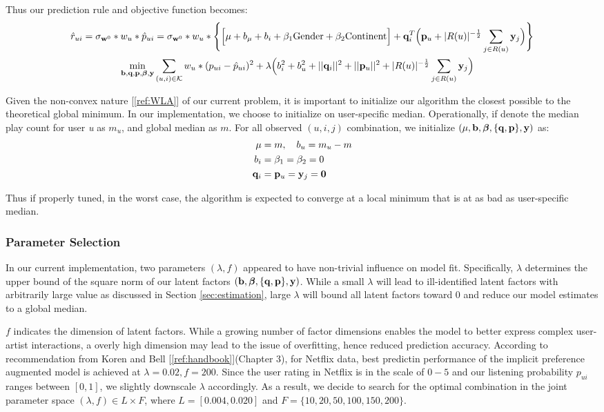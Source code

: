 \documentclass[11pt]{article}
\theoremstyle{definition}
\begin{document}
Thus our prediction rule and objective function becomes:
\begin{align*}
\hat{r}_{ui} = \sigma_{{\bf w}^0}*w_u*\hat{p}_{ui} &= 
\sigma_{{\bf w}^0}*w_u*
\Bigg\{ 
\Big[ \mu + b_\mu + b_i + \beta_1\mbox{Gender} + \beta_2\mbox{Continent} \Big] + 
{\bf q}_i^T \Big({\bf p}_u+|R(u)|^{-\frac{1}{2}} \sum_{j \in R(u)}{\bf y}_j \Big)
\Bigg\}
\\
\min_{{\bf b}, {\bf q},{\bf p}, \boldsymbol{\beta}, {\bf y}} & \sum_{(u, i) \in {\cal K}} w_u * (p_{ui} - \hat{p}_{ui})^2 + \lambda \Big(b_i^2 + b_u^2 + ||{\bf q}_i||^2 + ||{\bf p}_u||^2 +|R(u)|^{-\frac{1}{2}} \sum_{j \in R(u)}{\bf y}_j \Big)
\end{align*}

Given the non-convex nature [\ref{ref:WLA}] of our current problem, it is important to initialize our algorithm the closest possible to the theoretical  global minimum. In our implementation, we choose to initialize on user-specific median. Operationally, if denote the median play count for user \textit{u} as $m_u$, and global median as $m$. For all observed $(u, i, j)$ combination, we initialize $(\mu, {\bf b}, \boldsymbol{\beta}, \{{\bf q}, {\bf p}\}, {\bf y})$ as:
\begin{align*}
\mu &= m, \quad b_u = m_u - m \\
b_i &= \beta_1 = \beta_2 = 0\\
{\bf q}_i &= {\bf p}_u = {\bf y}_j = \textbf{0}
\end{align*}

Thus if properly tuned, in the worst case, the algorithm is expected to converge at a local minimum that is at as bad as user-specific median.

\subsubsection{Parameter Selection}

In our current implementation, two parameters $(\lambda, f)$ appeared to have non-trivial influence on model fit. Specifically, $\lambda$ determines the upper bound of the square norm of our latent factors $({\bf b}, \boldsymbol{\beta}, \{{\bf q}, {\bf p}\}, {\bf y})$. While a small $\lambda$ will lead to ill-identified latent factors with arbitrarily large value as discussed in Section \ref{sec:estimation}, large $\lambda$ will bound all latent factors toward 0 and reduce our model estimates to a global median. 

$f$ indicates the dimension of latent factors. While a growing number of factor dimensions enables the model to better express complex user- artist interactions, a overly high dimension may lead to the issue of overfitting, hence reduced prediction accuracy. According to recommendation from Koren and Bell [\ref{ref:handbook}](Chapter 3), for Netflix data, best predictin performance of the implicit preference augmented model is achieved at $\lambda = 0.02, f = 200$. Since the user rating in Netflix is in the scale of $0-5$ and our listening probability $p_{ui}$ ranges between $[0, 1]$, we slightly downscale $\lambda$ accordingly. As a result, we decide to search for the optimal combination in the joint parameter space $(\lambda, f) \in L \times F$, where $L = [ 0.004, 0.020] $ and $F = \{10, 20, 50, 100, 150, 200\}$. 
\end{document}
